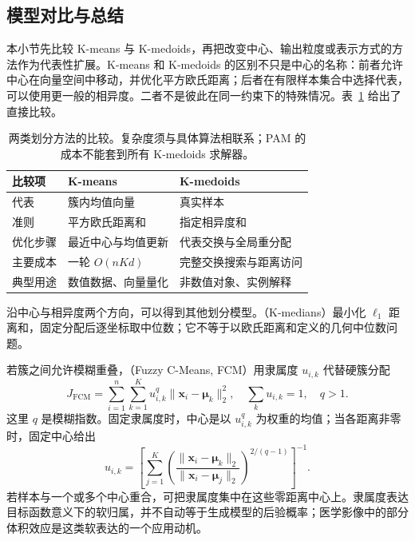 \subsection{模型对比与总结}

本小节先比较 K-means 与 K-medoids，再把改变中心、输出粒度或表示方式的方法作为代表性扩展。K-means 和 K-medoids 的区别不只是中心的名称：前者允许中心在向量空间中移动，并优化平方欧氏距离；后者在有限样本集合中选择代表，可以使用更一般的相异度。二者不是彼此在同一约束下的特殊情况。表~\ref{tab:clustering-partition} 给出了直接比较。

\begin{table}[htbp]
 \small
 \begin{tabularx}{\linewidth}{@{}l>{\RaggedRight\arraybackslash}X>{\RaggedRight\arraybackslash}X@{}}
 \toprule
 比较项 & K-means & K-medoids\\
 \midrule
 代表 & 簇内均值向量 & 真实样本\\
 准则 & 平方欧氏距离和 & 指定相异度和\\
 优化步骤 & 最近中心与均值更新 & 代表交换与全局重分配\\
 主要成本 & 一轮 $O(nKd)$ & 完整交换搜索与距离访问\\
 典型用途 & 数值数据、向量量化 & 非数值对象、实例解释\\
 \bottomrule
 \end{tabularx}
 \caption{两类划分方法的比较。复杂度须与具体算法相联系；PAM 的成本不能套到所有 K-medoids 求解器。}
 \label{tab:clustering-partition}
\end{table}

沿中心与相异度两个方向，可以得到其他划分模型。（K-medians）最小化 $\ell_1$ 距离和，固定分配后逐坐标取中位数；它不等于以欧氏距离和定义的几何中位数问题。

\Needspace{45mm}
若簇之间允许模糊重叠，（Fuzzy C-Means, FCM）用隶属度 $u_{i,k}$ 代替硬簇分配
\begin{equation}
 J_{\mathrm{FCM}}
 =\sum_{i=1}^n\sum_{k=1}^K
 u_{i,k}^{q}\lVert\bm{x}_i-\bm{\mu}_k\rVert_2^2,
 \quad \sum_k u_{i,k}=1,\quad q>1.
 \label{eq:clustering-fcm}
\end{equation}
这里 $q$ 是模糊指数。固定隶属度时，中心是以 $u_{i,k}^q$ 为权重的均值；当各距离非零时，固定中心给出
\[
 u_{i,k}=
 \left[
 \sum_{j=1}^K
 \left(\frac{\lVert\bm{x}_i-\bm{\mu}_k\rVert_2}
 {\lVert\bm{x}_i-\bm{\mu}_j\rVert_2}\right)^{2/(q-1)}
 \right]^{-1}.
\]
若样本与一个或多个中心重合，可把隶属度集中在这些零距离中心上。隶属度表达目标函数意义下的软归属，并不自动等于生成模型的后验概率；医学影像中的部分体积效应是这类软表达的一个应用动机。


